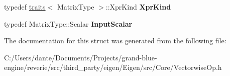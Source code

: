 \begin{DoxyCompactItemize}
typedef \mbox{\hyperlink{struct_eigen_1_1internal_1_1traits}{traits}}$<$ Matrix\+Type $>$\+::Xpr\+Kind {\bfseries Xpr\+Kind}
\item 
\mbox{\label{struct_eigen_1_1internal_1_1traits_3_01_partial_redux_expr_3_01_matrix_type_00_01_member_op_00_01_direction_01_4_01_4_a9d3b60f0417ed934e2540d7e77464223}} 
typedef Matrix\+Type\+::\+Scalar {\bfseries Input\+Scalar}
\end{DoxyCompactItemize}


The documentation for this struct was generated from the following file\+:\begin{DoxyCompactItemize}
\item 
C\+:/\+Users/dante/\+Documents/\+Projects/grand-\/blue-\/engine/reverie/src/third\+\_\+party/eigen/\+Eigen/src/\+Core/Vectorwise\+Op.\+h\end{DoxyCompactItemize}
